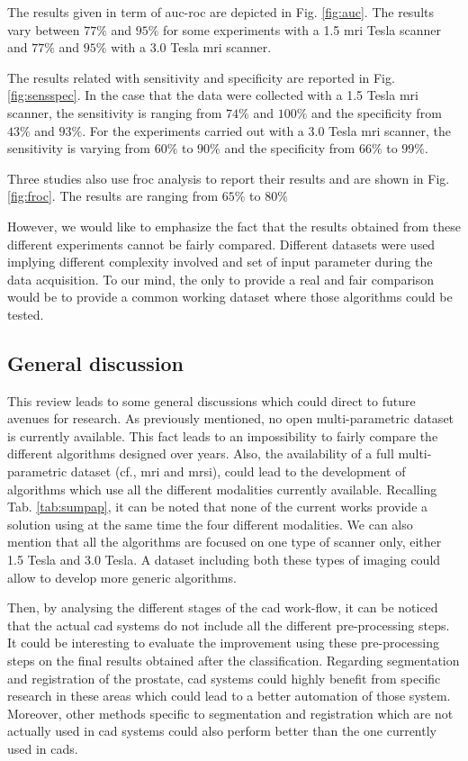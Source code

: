The results given in term of \ac{auc}-\ac{roc} are depicted in Fig. \ref{fig:auc}. The results vary between $77\%$ and $95\%$ for some experiments with a 1.5 \ac{mri} Tesla scanner and $77\%$ and $95\%$ with a 3.0 Tesla \ac{mri} scanner. 

The results related with sensitivity and specificity are reported in Fig. \ref{fig:sensspec}. In the case that the data were collected with a 1.5 Tesla \ac{mri} scanner, the sensitivity is ranging from $74\%$ and $100\%$ and the specificity from $43\%$ and $93\%$. For the experiments carried out with a 3.0 Tesla \ac{mri} scanner, the sensitivity is varying from $60\%$ to $90\%$ and the specificity from $66\%$ to $99\%$.

Three studies also use \ac{froc} analysis to report their results and are shown in Fig. \ref{fig:froc}. The results are ranging from $65\%$ to $80\%$

However, we would like to emphasize the fact that the results obtained from these different experiments cannot be fairly compared. Different datasets were used implying different complexity involved and set of input parameter during the data acquisition. To our mind, the only to provide a real and fair comparison would be to provide a common working dataset where those algorithms could be tested.

\subsection{General discussion}

This review leads to some general discussions which could direct to future avenues for research. As previously mentioned, no open multi-parametric dataset is currently available. This fact leads to an impossibility to fairly compare the different algorithms designed over years. Also, the availability of a full multi-parametric dataset (cf., \ac{mri} and \ac{mrsi}), could lead to the development of algorithms which use all the different modalities currently available. Recalling Tab. \ref{tab:sumpap}, it can be noted that none of the current works provide a solution using at the same time the four different modalities. We can also mention that all the algorithms are focused on one type of scanner only, either 1.5 Tesla and 3.0 Tesla. A dataset including both these types of imaging could allow to develop more generic algorithms.

Then, by analysing the different stages of the \ac{cad} work-flow, it can be noticed that the actual \ac{cad} systems do not include all the different pre-processing steps. It could be interesting to evaluate the improvement using these pre-processing steps on the final results obtained after the classification. Regarding segmentation and registration of the prostate, \ac{cad} systems could highly benefit from specific research in these areas which could lead to a better automation of those system. Moreover, other methods specific to segmentation and registration which are not actually used in \ac{cad} systems could also perform better than the one currently used in \acp{cad}.


